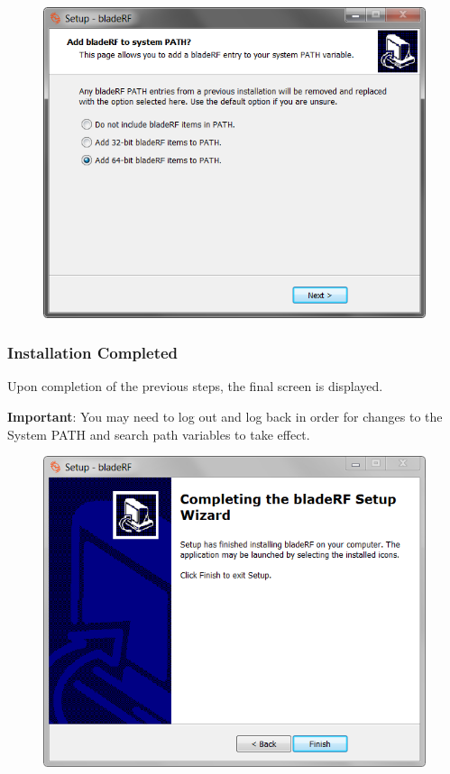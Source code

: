 {\begin{figure}[h]
  \centering
  \includegraphics{images/windows/installer/10-systempath.png}
\end{figure}


\newpage
\subsubsection{Installation Completed}

Upon completion of the previous steps, the final screen is displayed.

\textbf{Important}: You may need to log out and log back in order for
changes to the System PATH and \matlab search path variables to take effect.

\begin{figure}[h]
  \centering
  \includegraphics{images/windows/installer/11-complete.png}
\end{figure}

}
